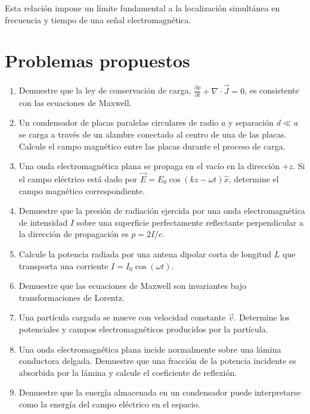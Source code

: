\documentclass[12pt,a4paper]{book}
\begin{document}
Esta relación impone un límite fundamental a la localización simultánea en frecuencia y tiempo de una señal electromagnética.

\section{Problemas propuestos}

\begin{enumerate}
\item Demuestre que la ley de conservación de carga, $\frac{\partial \rho}{\partial t} + \nabla \cdot \vec{J} = 0$, es consistente con las ecuaciones de Maxwell.

\item Un condensador de placas paralelas circulares de radio $a$ y separación $d \ll a$ se carga a través de un alambre conectado al centro de una de las placas. Calcule el campo magnético entre las placas durante el proceso de carga.

\item Una onda electromagnética plana se propaga en el vacío en la dirección $+z$. Si el campo eléctrico está dado por $\vec{E} = E_0 \cos(kz - \omega t) \hat{x}$, determine el campo magnético correspondiente.

\item Demuestre que la presión de radiación ejercida por una onda electromagnética de intensidad $I$ sobre una superficie perfectamente reflectante perpendicular a la dirección de propagación es $p = 2I/c$.

\item Calcule la potencia radiada por una antena dipolar corta de longitud $L$ que transporta una corriente $I = I_0 \cos(\omega t)$.

\item Demuestre que las ecuaciones de Maxwell son invariantes bajo transformaciones de Lorentz.

\item Una partícula cargada se mueve con velocidad constante $\vec{v}$. Determine los potenciales y campos electromagnéticos producidos por la partícula.

\item Una onda electromagnética plana incide normalmente sobre una lámina conductora delgada. Demuestre que una fracción de la potencia incidente es absorbida por la lámina y calcule el coeficiente de reflexión.

\item Demuestre que la energía almacenada en un condensador puede interpretarse como la energía del campo eléctrico en el espacio.


\end{enumerate}
\end{document}
